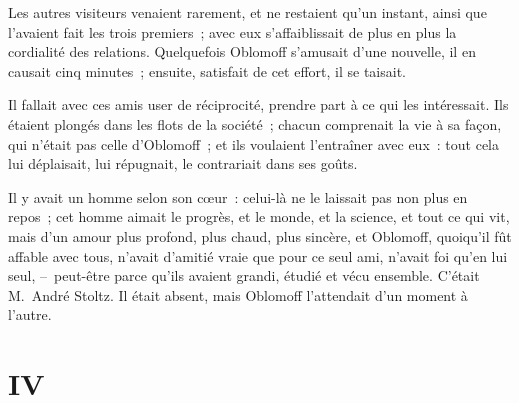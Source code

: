 \documentclass[french,twoside]{book} %
\begin{document}
Les autres visiteurs venaient rarement, et ne restaient qu’un instant, ainsi que l’avaient fait les trois premiers ; avec eux s’affaiblissait de plus en plus la cordialité des relations. Quelquefois Oblomoff s’amusait d’une nouvelle, il en causait cinq minutes ; ensuite, satisfait de cet effort, il se taisait.\par
Il fallait avec ces amis user de réciprocité, prendre part à ce qui les intéressait. Ils étaient plongés dans les flots de la société ; chacun comprenait la vie à sa façon, qui n’était pas celle d’Oblomoff ; et ils voulaient l’entraîner avec eux : tout cela lui déplaisait, lui répugnait, le contrariait dans ses goûts.\par
Il y avait un homme selon son cœur : celui-là ne le laissait pas non plus en repos ; cet homme aimait le progrès, et le monde, et la science, et tout ce qui vit, mais d’un amour plus profond, plus chaud, plus sincère, et Oblomoff, quoiqu’il fût affable avec tous, n’avait d’amitié vraie que pour ce seul ami, n’avait foi qu’en lui seul, – peut-être parce qu’ils avaient grandi, étudié et vécu ensemble. C’était M. André Stoltz. Il était absent, mais Oblomoff l’attendait d’un moment à l’autre.
\section[{IV}]{IV}\renewcommand{\leftmark}{IV}
\end{document}
